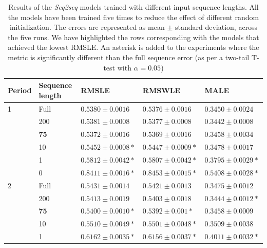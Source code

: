 	\begin{table}[!h]
	\footnotesize
	\caption{Results of the \textit{Seq2seq} models trained with different input sequence lengths. All the models have been trained five times to reduce the effect of different random initialization. The errors are represented as mean $\pm$ standard deviation, across the five runs. We have highlighted the rows corresponding with the models that achieved the lowest RMSLE. An asterisk is added to the experiments where the metric is significantly different than the full sequence error (as per a two-tail T-test with $\alpha=0.05$)}
	\label{tab:results_ablation_length}
	\centering
	\begin{tabular}{lllll}
		\hline
		Period & Sequence length & RMSLE                           & RMSWLE                         & MALE                           \\ \hline
		1      & Full            & $ 0.5380 \pm 0.0016 $           & $ 0.5376 \pm 0.0016 $          & $  0.3450 \pm 0.0024$          \\
      & 200             & $ 0.5381 \pm 0.0008 $           & $ 0.5377 \pm 0.0008 $          & $ 0.3442 \pm 0.0008 $          \\
      & \textbf{75}     & $ \mathbf{0.5372 \pm 0.0016} $  & $ \mathbf{0.5369 \pm 0.0016} $ & $ \mathbf{0.3458 \pm 0.0034} $ \\
      & 10              & $ 0.5452 \pm 0.0008 *$          & $ 0.5447 \pm 0.0009 *$         & $ 0.3478 \pm 0.0017 $          \\
      & 1               & $ 0.5812 \pm 0.0042 *$          & $ 0.5807 \pm 0.0042 *$         & $ 0.3795 \pm 0.0029 *$          \\
      & 0               & $ 0.8411 \pm 0.0016 *$          & $ 0.8453 \pm 0.0015 *$         & $ 0.5408 \pm 0.0028 *$          \\ \hline
		2      & Full            & $ 0.5431 \pm 0.0014 $           & $ 0.5421 \pm 0.0013 $          & $ 0.3475 \pm 0.0012 $          \\
      & 200             & $ 0.5413 \pm 0.0019 $           & $ 0.5403 \pm 0.0018 $          & $ 0.3444 \pm 0.0012 *$          \\
      & \textbf{75}     & $ \mathbf{0.5400 \pm 0.0010}* $ & $ \mathbf{0.5392 \pm 0.001}* $ & $ \mathbf{0.3458 \pm 0.0009} $ \\
      & 10              & $ 0.5510 \pm 0.0049 *$          & $ 0.5501 \pm 0.0048 *$         & $ 0.3509 \pm 0.0038 $          \\
      & 1               & $ 0.6162 \pm 0.0035 *$          & $ 0.6156 \pm 0.0037 *$         & $ 0.4011 \pm 0.0032 *$          \\

\end{tabular}
\end{table}
